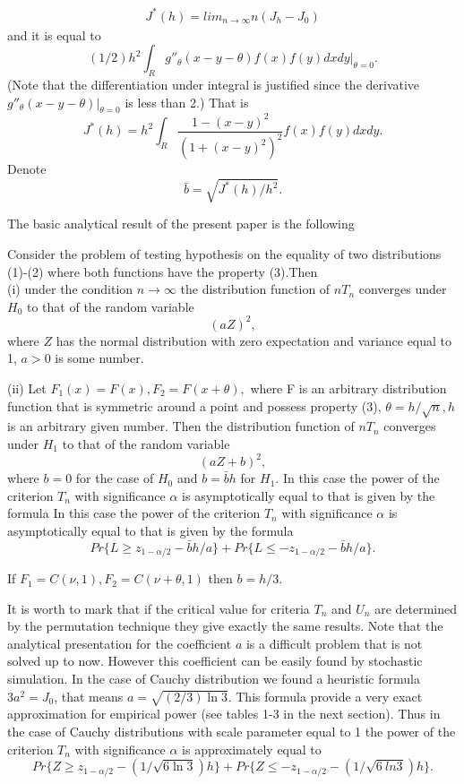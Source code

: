 \documentclass{svproc}
\begin{document}
\begin{eqnarray}
J^*(h)= lim_{n\to \infty} n(J_h - J_0)
\end{eqnarray}
and it is equal to
$$
(1/2)h^2 \int_R g''_\theta(x-y-\theta)f(x)f(y)dxdy|_{\theta=0}.
$$
(Note that the differentiation under integral is justified since the derivative $g ''_\theta(x-y-\theta)|_{\theta=0}$ is less than 2.)
That is
$$
J^*(h)=h^2 \int_R \frac {1-(x-y)^2}{(1+(x-y)^2)^2} f(x)f(y)dxdy.
$$
Denote
$$
\bar b =\sqrt{J^*(h)/h^2}.
$$

The basic analytical result of the present paper is the following
\begin{theorem} Consider the problem of testing hypothesis on the equality of two distributions (1)-(2) where both functions have the property (3).Then\\
(i) under the condition $n \to \infty$
the distribution function of $nT_n$  converges under $H_0$ to that of the random variable
\begin{equation}\label{Distr}
(aZ)^2,
\end{equation}
where  $Z$ has the normal distribution with zero expectation and variance equal to 1, $a>0$ is some number.

(ii)
Let $F_1(x)= F(x),F_2=F(x+\theta),$
where  F is an arbitrary distribution function that is symmetric around a point and possess property   (3),
$\theta=h/\sqrt{n},h$ is an arbitrary given number. Then
the distribution function of $nT_n$  converges under $H_1$ to that of the random variable
$$
(aZ + b)^2,
$$
where $ b=0$
for the case of $H_0$ and $b=\bar b h$
for  $H_1$.
In this case the power of the criterion $T_n$ with significance $\alpha$ is asymptotically equal to that is given by the formula
In this case the power of the criterion $T_n$ with significance $\alpha$ is asymptotically equal to that is given by the formula
$$
Pr\{L\geq z_{1-\alpha/2}-\bar bh/a\}
+ Pr\{L\leq - z_{1-\alpha/2}-\bar bh/a\}.
$$

If $F_1=C(\nu,1), F_2=C(\nu + \theta,1)$ then $ b= h/3$. 
\end{theorem}
It is worth to mark that if the critical value for criteria $T_n$ and $U_n$ are determined by the permutation technique they give exactly the same results.
Note that the analytical presentation for the coefficient $a$ is a difficult problem that is not solved up to now. However this coefficient can be easily found by stochastic simulation. In the case of Cauchy distribution we found a heuristic formula $3a^2= J_0$, that means $a =\sqrt{(2/3)\ln3}$. This formula provide a very exact approximation for empirical power (see tables 1-3 in the next section). 
Thus in the case of Cauchy distributions with scale parameter equal to 1  the power of the criterion $T_n$ with significance $\alpha$ is approximately equal to
$$
Pr\{Z\geq z_{1-\alpha/2}-(1/\sqrt{6\ln 3})h\}
+ Pr\{Z\leq - z_{1-\alpha/2}-(1/\sqrt{6\
ln 3})h\}.
$$
\end{document}
